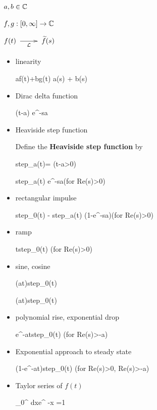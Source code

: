 $a, b\in{ \mathbb{C}}$

$f,g:[0,\infty]\rightarrow { \mathbb{C}}$

$f(t)\maparrow{\call} \TIL{f}(s)$


\begin{itemize}

\item linearity

\beq
af(t)+bg(t)
\maparrow{\call}
a(s)
+ b(s)
\eeq

\item
Dirac delta function

\beq
\delta(t-a)
\maparrow{\call}
e^{-sa}
\eeq

\item 
Heaviside step function

Define the
{\bf Heaviside step function} by

\beq
step_a(t)=
\indi(t-a>0)
\eeq

\beq
step_a(t)
\maparrow{\call}
e^{-sa}\quad (for Re(s)>0)
\eeq

\item rectangular impulse

\beq
step_0(t) - step_a(t)
\maparrow{\call} 
(1-e^{-sa})\quad(for Re(s)>0)
\eeq

\item ramp

\beq
t\;step_0(t)
\maparrow{\call}
\quad(for Re(s)>0)
\eeq

\item sine, cosine

\beq
\sin(at)step_0(t) \maparrow{\call}
\eeq

\beq
\cos(at)step_0(t) \maparrow{\call}
\eeq

\item
polynomial rise, exponential drop

\beq
{}e^{-at}\;step_0(t)
\maparrow{\call}
\quad(for Re(s)>-a)
\eeq

\item Exponential approach to steady state

\beq
(1-e^{-at})step_0(t)
\maparrow{\call}
\quad (for Re(s)>0, Re(s)>-a)
\eeq



\item Taylor series of $f(t)$

\beq
\int_0^\infty
dx\;e^{ -x} 
=1
\eeq


\end{itemize}
